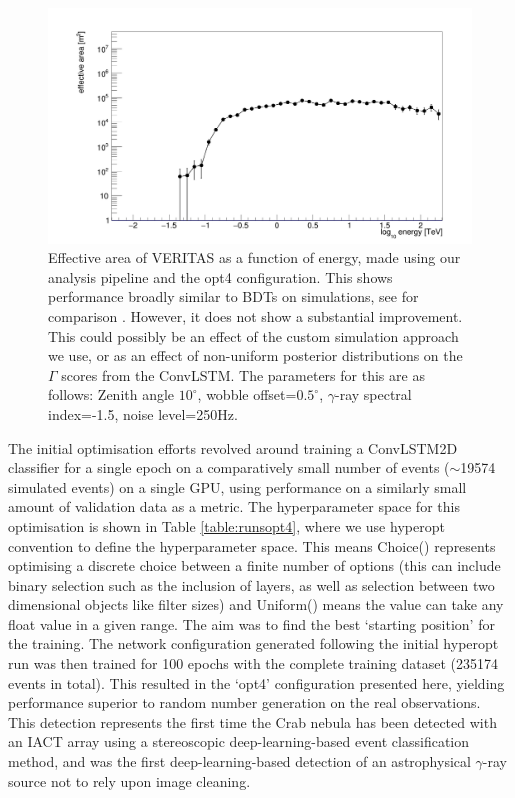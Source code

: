 \begin{figure}[] 
        \centering \includegraphics[width=\columnwidth]{figures/EFF.png}

        \caption{
                \label{fig:EFF} Effective area of VERITAS as a function of energy, made using our analysis pipeline and the opt4 configuration. This shows performance broadly similar to BDTs on simulations, see for comparison \cite{vereff}. However, it does not show a substantial improvement. This could possibly be an effect of the custom simulation approach we use, or as an effect of non-uniform posterior distributions on the $\Gamma$ scores from the ConvLSTM. The parameters for this are as follows: Zenith angle $10^{\circ}$, wobble offset=$0.5^{\circ}$, $\gamma$-ray spectral index=-1.5, noise level=250Hz. 
        }
\end{figure}
The initial optimisation efforts revolved around training a ConvLSTM2D classifier for a single epoch on a comparatively small number of events ($\sim$19574 simulated events) on a single GPU, using performance on a similarly small amount of validation data as a metric. The hyperparameter space for this optimisation is shown in Table \ref{table:runsopt4}, where we use hyperopt convention to define the hyperparameter space. This means Choice() represents optimising a discrete choice between a finite number of options (this can include binary selection such as the inclusion of layers, as well as selection between two dimensional objects like filter sizes) and Uniform() means the value can take any float value in a given range. The aim was to find the best `starting position' for the training. The network configuration generated following the initial hyperopt run was then trained for 100 epochs with the complete training dataset (235174 events in total). This resulted in the `opt4' configuration presented here, yielding performance superior to random number generation on the real observations. This detection represents the first time the Crab nebula has been detected with an IACT array using a stereoscopic deep-learning-based event classification method, and was the first deep-learning-based detection of an astrophysical $\gamma$-ray source not to rely upon image cleaning.

